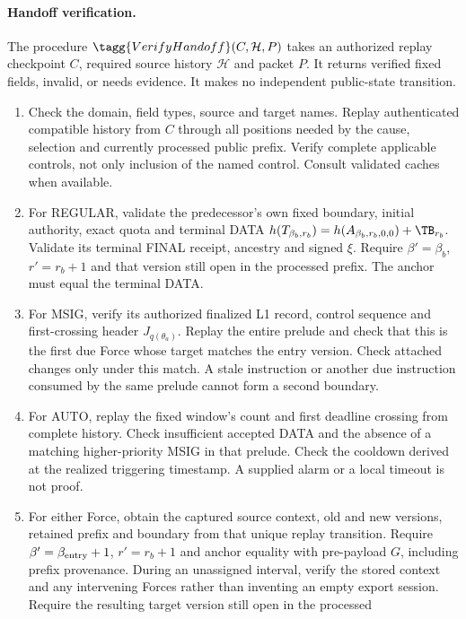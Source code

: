 \paragraph{Handoff verification.}
\label{sec:verify-handoff}
The procedure $\tagg{VerifyHandoff}(C,\mathcal H,P)$ takes an
authorized replay checkpoint $C$, required source history $\mathcal H$
and packet $P$. It returns verified fixed fields, invalid, or needs
evidence. It makes no independent public-state transition.
\begin{enumerate}[label=(\roman*),itemsep=2pt]
\item Check the domain, field types, source and target names. Replay
authenticated compatible history from $C$ through all positions
needed by the cause, selection and currently processed public prefix.
Verify complete applicable controls, not only inclusion of the named
control. Consult validated caches when available.
\item For REGULAR, validate the predecessor's own fixed boundary,
initial authority, exact quota and terminal DATA
$h(T_{\beta_b,r_b})=h(A_{\beta_b,r_b,0,0})+\TB_{r_b}$.
Validate its terminal FINAL receipt, ancestry and signed $\xi$.
Require $\beta'=\beta_b$, $r'=r_b+1$ and that version still open in
the processed prefix. The anchor must equal the terminal DATA.
\item For MSIG, verify its authorized finalized L1 record, control
sequence and first-crossing header $J_{q(\theta_a)}$. Replay the
entire prelude and check that this is the first due Force whose target
matches the entry version. Check attached changes only under this
match. A stale instruction or another due instruction consumed by the
same prelude cannot form a second boundary.
\item For AUTO, replay the fixed window's count and first deadline
crossing from complete history. Check insufficient accepted DATA and
the absence of a matching higher-priority MSIG in that prelude.
Check the cooldown derived at the realized triggering timestamp.
A supplied alarm or a local timeout is not proof.
\item For either Force, obtain the captured source context, old and
new versions, retained prefix and boundary from that unique replay
transition. Require $\beta'=\beta_{\rm entry}+1$, $r'=r_b+1$ and
anchor equality with pre-payload $G$, including prefix provenance.
During an unassigned interval, verify the stored context and any
intervening Forces rather than inventing an empty export session.
Require the resulting target version still open in the processed

\end{enumerate}
